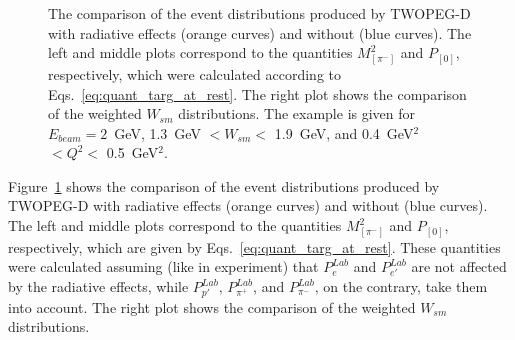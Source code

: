 

\begin{figure}[!ht]
\begin{center}
\end{center}
\caption{\small  The comparison of the event distributions produced by TWOPEG-D with radiative effects (orange curves) and without (blue curves). The left and middle plots correspond to the quantities $M_{[\pi^{-}]}^{2}$ and $P_{[0]}$, respectively, which were calculated according to Eqs.~\eqref{eq:quant_targ_at_rest}. The right plot shows the comparison of the weighted $W_{sm}$ distributions. The example is given for $E_{beam} = 2$~GeV, 1.3~GeV $< W_{sm} <$ 1.9~GeV, and 0.4~GeV$^2$ $< Q^{2}<$ 0.5~GeV$^2$.  }
\label{fig:w_ferm_rad_norad_comp}
\end{figure}

Figure~\ref{fig:w_ferm_rad_norad_comp} shows the comparison of the event distributions produced by TWOPEG-D with radiative effects (orange curves) and without (blue curves). The left and middle plots correspond to the quantities $M_{[\pi^{-}]}^{2}$ and $P_{[0]}$, respectively, which are given by Eqs.~\eqref{eq:quant_targ_at_rest}. These  quantities were calculated assuming (like in experiment) that $P_{e}^{Lab}$ and $P_{e'}^{Lab}$ are not affected by the radiative effects, while $P_{p'}^{Lab}$, $P_{\pi^{+}}^{Lab}$, and $P_{\pi^{-}}^{Lab}$, on the contrary, take them into account. The right plot shows the comparison of the weighted $W_{sm}$ distributions. 



